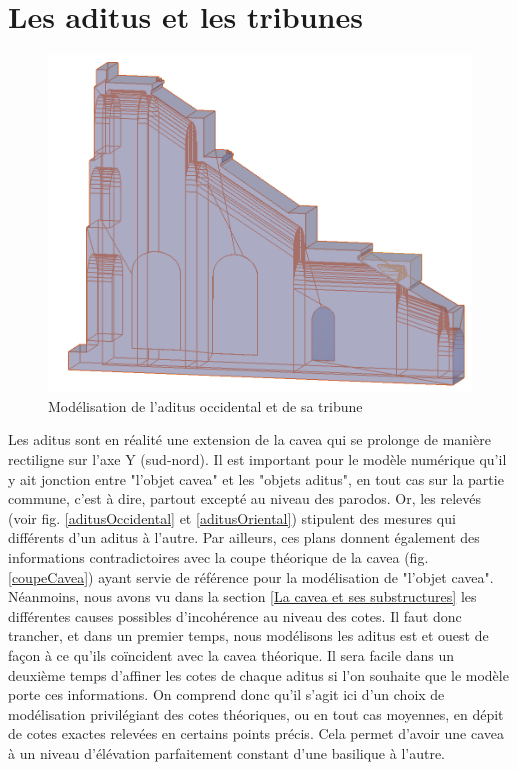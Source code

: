 		
\section{Les \gls{aditus} et les tribunes} 

\begin{figure}[!h]
	\includegraphics[width=\linewidth]{images/modAditus}
	\caption{Modélisation de l'\gls{aditus} occidental et de sa tribune} 
	\label{modAditus} 
\end{figure}  
		
Les \gls{aditus} sont en réalité une extension de la \gls{cavea} qui se prolonge de manière rectiligne sur l'axe Y (sud-nord). Il est important pour le modèle numérique qu'il y ait jonction entre "l'objet cavea" et les "objets aditus", en tout cas sur la partie commune, c'est à dire, partout excepté au niveau des \gls{parodos}. Or, les relevés (voir fig. \ref{aditusOccidental} et \ref{aditusOriental}) stipulent des mesures qui différents d'un \gls{aditus} à l'autre. Par ailleurs, ces plans donnent également des informations contradictoires avec la coupe théorique de la \gls{cavea} (fig. \ref{coupeCavea}) ayant servie de référence pour la modélisation de "l'objet cavea". Néanmoins, nous avons vu dans la section \ref{La cavea et ses substructures} les différentes causes possibles d'incohérence au niveau des cotes. Il faut donc trancher, et dans un premier temps, nous modélisons les \gls{aditus} est et ouest de façon à ce qu'ils coïncident avec la \gls{cavea} théorique. Il sera facile dans un deuxième temps d'affiner les cotes de chaque  \gls{aditus} si l'on souhaite que le modèle porte ces informations. On comprend donc qu'il s'agit ici d'un choix de modélisation privilégiant des cotes théoriques, ou en tout cas moyennes, en dépit de cotes exactes relevées en certains points précis. Cela permet d'avoir une \gls{cavea} à un niveau d'élévation parfaitement constant d'une \gls{basilique} à l'autre. 

